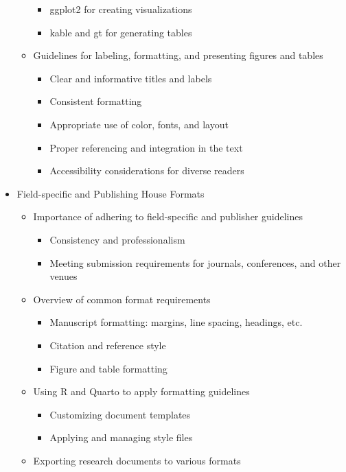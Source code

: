\documentclass[
  letterpaper,
  DIV=11,
  numbers=noendperiod]{scrreprt}
\providecommand{\tightlist}{%
  \setlength{\itemsep}{0pt}\setlength{\parskip}{0pt}}\usepackage{longtable,booktabs,array}
\theoremstyle{definition}
\theoremstyle{remark}
\begin{document}
\begin{itemize}
\begin{itemize}
    \begin{itemize}
    \tightlist
    \item
      ggplot2 for creating visualizations
    \item
      kable and gt for generating tables
    \end{itemize}
  \item
    Guidelines for labeling, formatting, and presenting figures and
    tables

    \begin{itemize}
    \tightlist
    \item
      Clear and informative titles and labels
    \item
      Consistent formatting
    \item
      Appropriate use of color, fonts, and layout
    \item
      Proper referencing and integration in the text
    \item
      Accessibility considerations for diverse readers
    \end{itemize}
  \end{itemize}
\item
  Field-specific and Publishing House Formats

  \begin{itemize}
  \tightlist
  \item
    Importance of adhering to field-specific and publisher guidelines

    \begin{itemize}
    \tightlist
    \item
      Consistency and professionalism
    \item
      Meeting submission requirements for journals, conferences, and
      other venues
    \end{itemize}
  \item
    Overview of common format requirements

    \begin{itemize}
    \tightlist
    \item
      Manuscript formatting: margins, line spacing, headings, etc.
    \item
      Citation and reference style
    \item
      Figure and table formatting
    \end{itemize}
  \item
    Using R and Quarto to apply formatting guidelines

    \begin{itemize}
    \tightlist
    \item
      Customizing document templates
    \item
      Applying and managing style files
    \end{itemize}
  \item
    Exporting research documents to various formats


\end{itemize}
\end{itemize}
\end{document}
